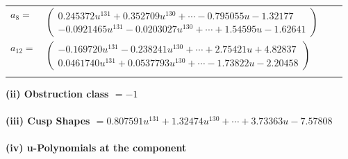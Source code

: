 \documentclass[1p]{elsarticle_modified}
\theoremstyle{definition}
\begin{document}
\begin{tabular}{m{7pt} m{180pt} m{7pt} m{180pt} }
\flushright $a_{8}=$&$\begin{pmatrix}0.245372 u^{131}+0.352709 u^{130}+\cdots-0.795055 u-1.32177\\-0.0921465 u^{131}-0.0203027 u^{130}+\cdots+1.54595 u-1.62641\end{pmatrix}$ \\
\flushright $a_{12}=$&$\begin{pmatrix}-0.169720 u^{131}-0.238241 u^{130}+\cdots+2.75421 u+4.82837\\0.0461740 u^{131}+0.0537793 u^{130}+\cdots-1.73822 u-2.20458\end{pmatrix}$\\&\end{tabular}
\flushleft \textbf{(ii) Obstruction class $= -1$}\\~\\
\flushleft \textbf{(iii) Cusp Shapes $= 0.807591 u^{131}+1.32474 u^{130}+\cdots+3.73363 u-7.57808$}\\~\\
\newpage\renewcommand{\arraystretch}{1}
\flushleft \textbf{(iv) u-Polynomials at the component}\newline \\
\end{document}
